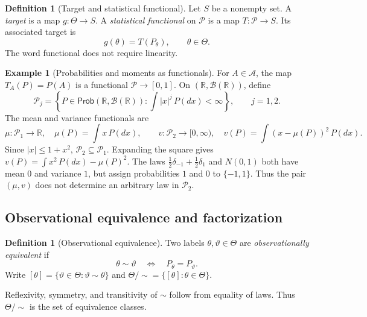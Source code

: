 \documentclass[11pt,oneside]{book}
\theoremstyle{definition}
\newtheorem{definition}[theorem]{Definition}
\newtheorem{example}[theorem]{Example}
\theoremstyle{remark}
\newcommand{\Prob}{\mathsf{Prob}}
\newcommand{\R}{\mathbb R}
\begin{document}
\begin{definition}[Target and statistical functional]
\label{def:target-functional}
Let $S$ be a nonempty set. A \emph{target} is a map $g:\Theta\to S$.
A \emph{statistical functional} on $\mathcal P$ is a map
$T:\mathcal P\to S$. Its associated target is
\[
g(\theta)=T(P_\theta),\qquad \theta\in\Theta.
\]
The word functional does not require linearity.
\end{definition}

\begin{example}[Probabilities and moments as functionals]
\label{ex:law-functionals}
For $A\in\mathcal A$, the map $T_A(P)=P(A)$ is a functional
$\mathcal P\to[0,1]$.
On $(\R,\mathcal B(\R))$, define
\[
\mathcal P_j=\left\{P\in\Prob(\R,\mathcal B(\R)):
\int |x|^j\,P(dx)<\infty\right\},\qquad j=1,2.
\]
The mean and variance functionals are
\[
\mu:\mathcal P_1\to\R,\quad \mu(P)=\int x\,P(dx),\qquad
v:\mathcal P_2\to[0,\infty),\quad
v(P)=\int(x-\mu(P))^2\,P(dx).
\]
Since $|x|\leq1+x^2$, $\mathcal P_2\subseteq\mathcal P_1$.
Expanding the square gives $v(P)=\int x^2\,P(dx)-\mu(P)^2$.
The laws $\tfrac12\delta_{-1}+\tfrac12\delta_1$ and $N(0,1)$ both have
mean $0$ and variance $1$, but assign probabilities $1$ and $0$ to
$\{-1,1\}$. Thus the pair $(\mu,v)$ does not determine an arbitrary law
in $\mathcal P_2$.
\end{example}

\subsection{Observational equivalence and factorization}
\label{subsec:observational-equivalence}

\begin{definition}[Observational equivalence]
\label{def:observational-equivalence}
Two labels $\theta,\vartheta\in\Theta$ are \emph{observationally equivalent}
if
\[
\theta\sim\vartheta\quad\Longleftrightarrow\quad P_\theta=P_\vartheta.
\]
Write $[\theta]=\{\vartheta\in\Theta:\vartheta\sim\theta\}$ and
$\Theta/{\sim}=\{[\theta]:\theta\in\Theta\}$.
\end{definition}

Reflexivity, symmetry, and transitivity of $\sim$ follow from equality of laws.
Thus $\Theta/{\sim}$ is the set of equivalence classes.
\end{document}
